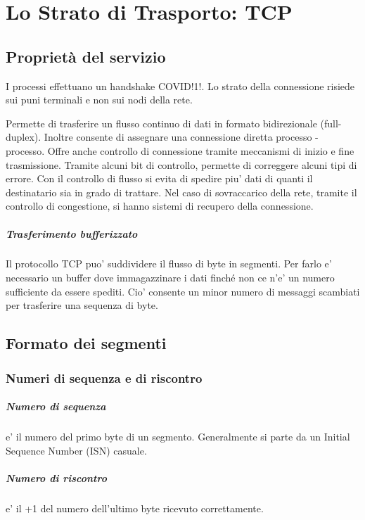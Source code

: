 \chapter{Lo Strato di Trasporto: TCP}
\section{Proprietà del servizio}
I processi effettuano un handshake {\tiny\color{red}COVID!1!}.
Lo strato della connessione risiede sui puni terminali e non sui nodi della rete.

Permette di trasferire un flusso continuo di dati in formato bidirezionale (full-duplex).
Inoltre consente di assegnare una connessione diretta processo - processo.
Offre anche controllo di connessione tramite meccanismi di inizio e fine trasmissione.
Tramite alcuni bit di controllo, permette di correggere alcuni tipi di errore.
Con il controllo di flusso si evita di spedire piu' dati di quanti il destinatario sia in grado di trattare.
Nel caso di sovraccarico della rete, tramite il controllo di congestione, si hanno sistemi di recupero della connessione.
\paragraph{Trasferimento bufferizzato}
Il protocollo TCP puo' suddividere il flusso di byte in segmenti. Per farlo e' necessario un buffer dove immagazzinare i dati finché non ce n'e' un numero sufficiente da essere spediti.
Cio' consente un minor numero di messaggi scambiati per trasferire una sequenza di byte.
\section{Formato dei segmenti}
\subsection{Numeri di sequenza e di riscontro}
\paragraph{Numero di sequenza} e' il numero del primo byte di un segmento.
Generalmente si parte da un Initial Sequence Number (ISN) casuale.
\paragraph{Numero di riscontro} e' il +1 del numero dell'ultimo byte ricevuto correttamente.

